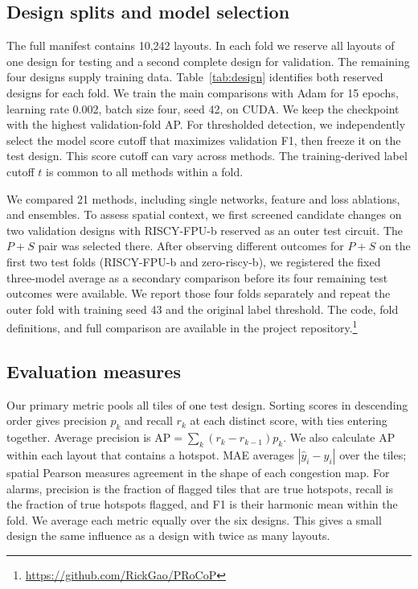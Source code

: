 \IfFileExists{./ieeeconf.cls}{\documentclass[9pt]{ieeeconf}}{\documentclass[conference]{IEEEtran}\usepackage[T1]{fontenc}}
\begin{document}
\subsection{Design splits and model selection}
The full manifest contains 10,242 layouts. In each fold we reserve all layouts of one design for testing and a second complete design for validation. The remaining four designs supply training data. Table~\ref{tab:design} identifies both reserved designs for each fold. We train the main comparisons with Adam for 15 epochs, learning rate 0.002, batch size four, seed 42, on CUDA. We keep the checkpoint with the highest validation-fold AP. For thresholded detection, we independently select the model score cutoff that maximizes validation F1, then freeze it on the test design. This score cutoff can vary across methods. The training-derived label cutoff $t$ is common to all methods within a fold.

We compared 21 methods, including single networks, feature and loss ablations, and ensembles. To assess spatial context, we first screened candidate changes on two validation designs with RISCY-FPU-b reserved as an outer test circuit. The $P+S$ pair was selected there. After observing different outcomes for $P+S$ on the first two test folds (RISCY-FPU-b and zero-riscy-b), we registered the fixed three-model average as a secondary comparison before its four remaining test outcomes were available. We report those four folds separately and repeat the outer fold with training seed 43 and the original label threshold. The code, fold definitions, and full comparison are available in the project repository.\footnote{\url{https://github.com/RickGao/PRoCoP}}

\subsection{Evaluation measures}
Our primary metric pools all tiles of one test design. Sorting scores in descending order gives precision $p_k$ and recall $r_k$ at each distinct score, with ties entering together. Average precision is $\mathrm{AP}=\sum_k (r_k-r_{k-1})p_k$. We also calculate AP within each layout that contains a hotspot. MAE averages $|\hat y_i-y_i|$ over the tiles; spatial Pearson measures agreement in the shape of each congestion map. For alarms, precision is the fraction of flagged tiles that are true hotspots, recall is the fraction of true hotspots flagged, and F1 is their harmonic mean within the fold. We average each metric equally over the six designs. This gives a small design the same influence as a design with twice as many layouts.
\end{document}
